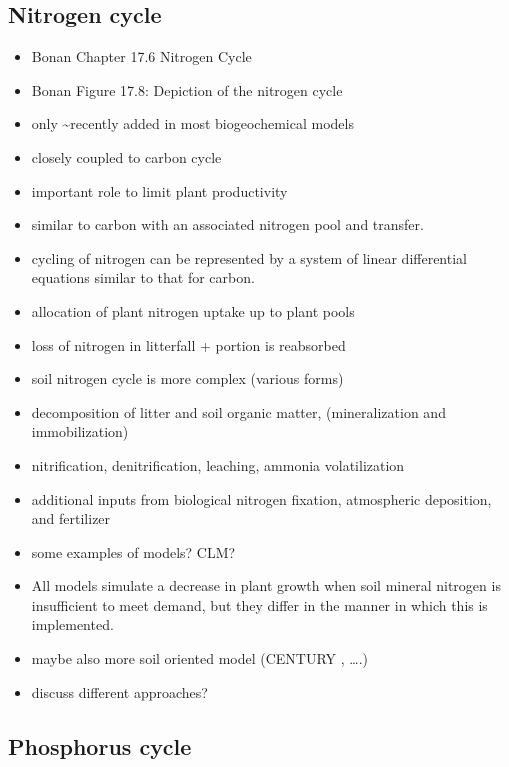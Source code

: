 \documentclass[
  oneside]{book}
\begin{document}
\hypertarget{nitrogen-cycle}{%
\subsection{Nitrogen cycle}\label{nitrogen-cycle}}

\begin{itemize}
\item
  Bonan Chapter 17.6 Nitrogen Cycle
\item
  Bonan Figure 17.8: Depiction of the nitrogen cycle
\item
  only \textasciitilde recently added in most biogeochemical models
\item
  closely coupled to carbon cycle
\item
  important role to limit plant productivity
\item
  similar to carbon with an associated nitrogen pool and transfer.
\item
  cycling of nitrogen can be represented by a system of linear differential equations similar to that for carbon.
\item
  allocation of plant nitrogen uptake up to plant pools
\item
  loss of nitrogen in litterfall + portion is reabsorbed
\item
  soil nitrogen cycle is more complex (various forms)
\item
  decomposition of litter and soil organic matter, (mineralization and immobilization)
\item
  nitrification, denitrification, leaching, ammonia volatilization
\item
  additional inputs from biological nitrogen fixation, atmospheric deposition, and fertilizer
\item
  some examples of models? CLM?
\item
  All models simulate a decrease in plant growth when soil mineral nitrogen is insufficient to meet demand, but they differ in the manner in which this is implemented.
\item
  maybe also more soil oriented model (CENTURY , \ldots.)
\item
  discuss different approaches?
\end{itemize}

\hypertarget{phosphorus-cycle}{%
\subsection{Phosphorus cycle}\label{phosphorus-cycle}}
\end{document}
